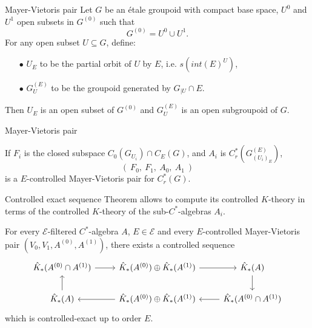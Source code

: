 \begin{frame}{Mayer-Vietoris pair}
Let $G$ be an \'etale groupoid with compact base space, $U^0$ and $U^1$ open subsets in $G^{(0)}$ such that
\[G^{(0)} = U^0 \cup U^1. \]
For any open subset $U\subseteq G$, define:
\begin{itemize}
\item[$\bullet$] $U_E$ to be the partial orbit of $U$ by $E$, i.e. $s(int(E)^U)$, 
\item[$\bullet$] $G^{(E)}_U$ to be the groupoid generated by $G_{|U}\cap E$.
\end{itemize} 
Then $U_E$ is an open subset of $G^{(0)}$ and $G^{(E)}_U$ is an open subgroupoid of $G$.\\
\end{frame}

\begin{frame}{Mayer-Vietoris pair}
\begin{propfr} 
If $F_i$ is the closed subspace $C_0(G_{U_i})\cap C_E(G)$, and $A_i$ is $C_r^*(G_{(U_i)_E}^{(E)})$, 
\[\left( \ F_0 , \ F_1 ,\ A_0 , \ A_1  \  \right)\]
is a $E$-controlled Mayer-Vietoris pair for $C_r^*(G)$. 
\end{propfr}
\end{frame}
\begin{frame}{Controlled exact sequence}
Theorem  allows to compute its controlled $K$-theory in terms of the controlled $K$-theory of the sub-$C^*$-algebras $A_i$. 

\begin{thmfr}[$3.10$ of \cite{OY4}]
For every $\mathcal E$-filtered $C^*$-algebra $A$, $E\in \mathcal E$ and every $E$-controlled Mayer-Vietoris pair $(V_0, V_1, A^{(0)}, A^{(1)})$, there exists a controlled sequence
\[\begin{tikzcd}[ampersand replacement=\&]
 \hat K_*( A^{(0)}\cap A^{(1)} ) \arrow{r} \& \hat K_*(A^{(0)}) \oplus \hat K_*(A^{(1)}) \arrow{r} \& \hat K_*(A) \arrow{d} \\ 
\hat K_*(A) \arrow{u} \& \hat K_*(A^{(0)}) \oplus \hat K_*(A^{(1)}) \arrow{l} \& \hat K_*( A^{(0)}\cap A^{(1)} ) \arrow{l}
\end{tikzcd}\] 
which is controlled-exact up to order $E$.  
\end{thmfr}  
\end{frame}
